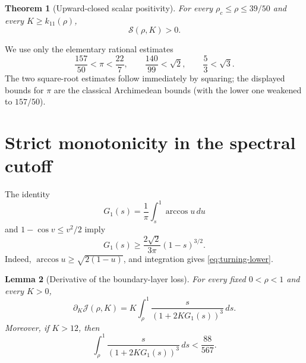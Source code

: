 \documentclass[11pt]{article}
\newtheorem{theorem}{Theorem}
\newtheorem{lemma}[theorem]{Lemma}
\theoremstyle{remark}
\begin{document}
\begin{theorem}[Upward-closed scalar positivity]
\label{thm:scalar-positive}
For every \(\rho_c\leq\rho\leq39/50\) and every
\(K\geq k_{11}(\rho)\),
\begin{equation}
 \boxed{\mathcal S(\rho,K)>0.}
 \label{eq:target}
\end{equation}
\end{theorem}

We use only the elementary rational estimates
\begin{equation}
 \frac{157}{50}<\pi<\frac{22}{7},
 \qquad
 \frac{140}{99}<\sqrt2,
 \qquad
 \frac53<\sqrt3.
 \label{eq:rational-constants}
\end{equation}
The two square-root estimates follow immediately by squaring; the
displayed bounds for \(\pi\) are the classical Archimedean bounds (with
the lower one weakened to \(157/50\)).

\section{Strict monotonicity in the spectral cutoff}

The identity
\begin{equation}
 G_1(s)=\frac1\pi\int_s^1\arccos u\,du
 \label{eq:G-integral}
\end{equation}
and \(1-\cos v\leq v^2/2\) imply
\begin{equation}
 G_1(s)\geq
 \frac{2\sqrt2}{3\pi}(1-s)^{3/2}.
 \label{eq:turning-lower}
\end{equation}
Indeed, \(\arccos u\geq\sqrt{2(1-u)}\), and integration gives
\eqref{eq:turning-lower}.

\begin{lemma}[Derivative of the boundary-layer loss]
\label{lem:J-derivative}
For every fixed \(0<\rho<1\) and every \(K>0\),
\begin{equation}
 \partial_K\mathcal J(\rho,K)
 =K\int_\rho^1
 \frac{s}{(1+2KG_1(s))^3}\,ds.
 \label{eq:J-derivative}
\end{equation}
Moreover, if \(K>12\), then
\begin{equation}
 \int_\rho^1
 \frac{s}{(1+2KG_1(s))^3}\,ds
 <\frac{88}{567}.
 \label{eq:cubic-loss}
\end{equation}
\end{lemma}
\end{document}
